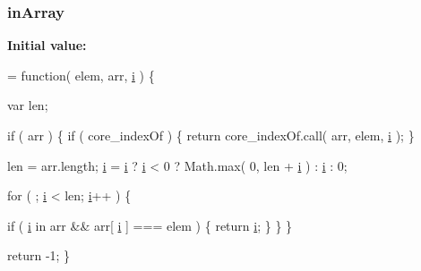 \subsubsection[{in\+Array}]{ in\+Array}\label{jquery-1_810_82-vsdoc_8js_a8203f20935038ea9f23057d6b9bd0c35}
{\bfseries Initial value\+:}
\begin{DoxyCode}
= \textcolor{keyword}{function}( elem, arr, \hyperlink{_bibabook_2_scripts_2respond_8min_8js_a5e25b1d1bed9ab5f3174b76d6a722180}{i} ) \{


        var len;

        \textcolor{keywordflow}{if} ( arr ) \{
            \textcolor{keywordflow}{if} ( core\_indexOf ) \{
                \textcolor{keywordflow}{return} core\_indexOf.call( arr, elem, \hyperlink{_bibabook_2_scripts_2respond_8min_8js_a5e25b1d1bed9ab5f3174b76d6a722180}{i} );
            \}

            len = arr.length;
            \hyperlink{_bibabook_2_scripts_2respond_8min_8js_a5e25b1d1bed9ab5f3174b76d6a722180}{i} = \hyperlink{_bibabook_2_scripts_2respond_8min_8js_a5e25b1d1bed9ab5f3174b76d6a722180}{i} ? \hyperlink{_bibabook_2_scripts_2respond_8min_8js_a5e25b1d1bed9ab5f3174b76d6a722180}{i} < 0 ? Math.max( 0, len + \hyperlink{_bibabook_2_scripts_2respond_8min_8js_a5e25b1d1bed9ab5f3174b76d6a722180}{i} ) : \hyperlink{_bibabook_2_scripts_2respond_8min_8js_a5e25b1d1bed9ab5f3174b76d6a722180}{i} : 0;

            \textcolor{keywordflow}{for} ( ; \hyperlink{_bibabook_2_scripts_2respond_8min_8js_a5e25b1d1bed9ab5f3174b76d6a722180}{i} < len; \hyperlink{_bibabook_2_scripts_2respond_8min_8js_a5e25b1d1bed9ab5f3174b76d6a722180}{i}++ ) \{
                
                \textcolor{keywordflow}{if} ( \hyperlink{_bibabook_2_scripts_2respond_8min_8js_a5e25b1d1bed9ab5f3174b76d6a722180}{i} in arr && arr[ \hyperlink{_bibabook_2_scripts_2respond_8min_8js_a5e25b1d1bed9ab5f3174b76d6a722180}{i} ] === elem ) \{
                    \textcolor{keywordflow}{return} \hyperlink{_bibabook_2_scripts_2respond_8min_8js_a5e25b1d1bed9ab5f3174b76d6a722180}{i};
                \}
            \}
        \}

        \textcolor{keywordflow}{return} -1;
    \}
\end{DoxyCode}
\hypertarget{jquery-1_810_82-vsdoc_8js_a75bb12d1f23302a9eea93a6d89d0193e}{}
